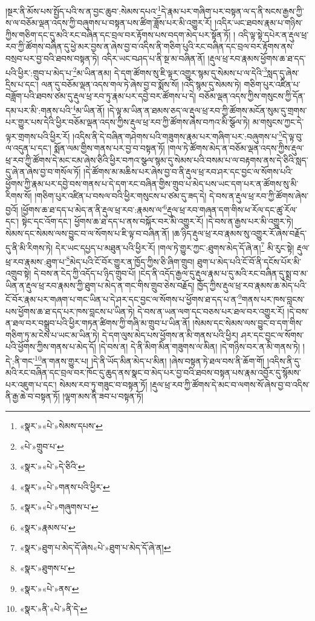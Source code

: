 །སྔར་ནི་མོས་པས་སྤྱོད་པའི་ས་ན་བྱང་ཆུབ་:སེམས་དཔའ་\footnote{«སྣར་»«པེ་»སེམས་དཔས་}དེ་རྣམ་པར་གཞིག་པར་བསྟན་ལ་ད་ནི་སངས་རྒྱས་ཀྱི་ས་ལ་བཅོམ་ལྡན་འདས་ཀྱི་བཞུགས་པ་བསྟན་པས་ཚིག་ཟློས་པར་མི་འགྱུར་རོ། །འདིར་ཡང་ཐབས་རྣམ་པ་གཉིས་ཀྱིས་གཅིག་དང་དུ་མའི་རང་བཞིན་དང་བྲལ་བར་རྟོགས་པས་བདག་མེད་པར་སྟོན་ཏོ། །
འདི་ལྟ་སྟེ་དཔེར་ན་རྡུལ་ཕྲ་རབ་ཀྱི་ཚོགས་བཞིན་དུ་ཕྱེ་མར་བྱས་ན་ཞེས་བྱ་བ་འདིས་ནི་གཅིག་པུའི་རང་བཞིན་དང་བྲལ་བར་རྟོགས་ནས་བསྲབ་པར་བྱ་བའི་ཐབས་བསྟན་ཏེ། འདིར་ཡང་བཤད་པ་ནི་སྔ་མ་བཞིན་ནོ། །རྡུལ་ཕྲ་རབ་རྣམས་ཕྱོགས་ཆ་ཐ་དད་པའི་ཕྱིར་:གྲུབ་པ་མེད་པ་\footnote{«པེ་»གྲུབ་པ་}མ་ཡིན་ནམ། དེ་དག་ཚོགས་སུ་ཇི་ལྟར་འགྱུར་སྙམ་དུ་སེམས་པ་ལ་དེའི་\footnote{«སྣར་»«པེ་»དེ་ཅིའི་}སླད་དུ་ཞེས་དྲིས་པ་དང་། ལན་དུ་བཅོམ་ལྡན་འདས་གལ་ཏེ་ཞེས་བྱ་བ་སྨོས་སོ། །འདི་སྙམ་དུ་སེམས་ཏེ། གཅིག་པུར་འཛིན་པ་བཟློག་པའི་ཐབས་ཙམ་དུ་རྡུལ་ཕྲ་རབ་ཏུ་རྣམ་པར་དབྱེ་བར་ཚོགས་པ་དེ། བཅོམ་ལྡན་འདས་ཀྱིས་གསུངས་ཀྱི་དོན་དམ་པར་མི་:གནས་པའི་\footnote{«སྣར་»«པེ་»གནས་པའི་ཕྱིར་}མ་ཡིན་ནོ། །དེ་ལྟ་མ་ཡིན་ན་ཐམས་ཅད་ལ་རྡུལ་ཕྲ་རབ་ཀྱི་ཚོགས་མངོན་སུམ་དུ་གྲགས་པར་གྱུར་པས་དེའི་ཕྱིར་བཅོམ་ལྡན་འདས་ཀྱིས་རྡུལ་ཕྲ་རབ་ཀྱི་ཚོགས་ཞེས་བཀའ་མི་སྩོལ་ཏེ། མ་གསུངས་ཀྱང་དེ་ལྟར་གྲགས་པའི་ཕྱིར་རོ། །འདིས་ནི་དེ་བཞིན་གཤེགས་པའི་གཟུགས་རྣམ་པར་གཞིག་པར་:བཞུགས་པ་\footnote{«སྣར་»«པེ་»གཞུགས་པ་}དེ་ལྟ་བུ་ལ་འདུན་པ་དང་། སྨོན་ལམ་གྱིས་གནས་པར་བྱ་བ་བསྟན་ཏོ། །གལ་ཏེ་ཚོགས་མེད་ན་བཅོམ་ལྡན་འདས་ཀྱིས་རྡུལ་ཕྲ་རབ་ཀྱི་ཚོགས་དེ་མང་ངམ་ཞེས་ཅིའི་ཕྱིར་བཀའ་སྩལ་སྙམ་དུ་སེམས་པའི་བསམ་པ་ལ་བརྟགས་ནས་དེ་ཅིའི་སླད་དུ་ཞེ་ན་ཞེས་བྱ་བ་གསོལ་ཏོ། །དེ་ཚོགས་མ་མཆིས་པར་ཞེས་བྱ་བ་ནི་རྡུལ་ཕྲ་རབ་ཤར་དང་བྱང་ལ་སོགས་པའི་ཕྱོགས་ཀྱི་རྣམ་པར་དབྱེ་བས་གནས་པ་དེ་དག་རང་བཞིན་གྱིས་གྲུབ་པ་མེད་པས་ཡང་དག་པར་ན་ཚོགས་སུ་མི་རིགས་སོ། །གཅིག་པུར་འཛིན་པ་བསལ་བའི་ཕྱིར་གསུངས་པ་ཙམ་དུ་ཟད་དེ། དེ་བས་ན་རྡུལ་ཕྲ་རབ་ཀྱི་ཚོགས་ཞེས་བྱའོ། །ཕྱོགས་ཆ་ཐ་དད་པ་མེད་ན་ནི་རྡུལ་ཕྲ་རབ་:རྣམས་ལ་\footnote{«སྣར་»རྣམས་པ་}རྡུལ་ཕྲ་རབ་གཞན་དག་གིས་ཕ་རོལ་དང་ཚུ་རོལ་དང་། སྟེང་དང་འོག་དང་། ཕྱོགས་ཆ་ཐ་དད་པ་ནས་བསྐོར་བར་མི་འགྱུར་རོ། །དེ་བས་ན་རྒྱས་པར་མི་འགྱུར་ཏེ། སེམས་དང་སེམས་ལས་བྱུང་བ་ལ་སོགས་པ་ཇི་ལྟ་བ་བཞིན་ནོ། །ཆ་ཉིད་རྡུལ་ཕྲ་རབ་རྣམས་སུ་འགྱུར་རོ་ཞེས་བརྗོད་དུ་ནི་མི་རིགས་ཏེ། དེར་ཡང་དཔྱད་པ་མཐུན་པའི་ཕྱིར་རོ། །གལ་ཏེ་གྱུར་ཀྱང་:ཐུགས་མེད་དོ་ཞེ་ན།\footnote{«སྣར་»ཐུག་པ་མེད་དོ་ཞེས«པེ་»ཐུག་པ་མེད་དོ་ཞེ་ན།} མི་རུང་སྟེ། རྡུལ་ཕྲ་རབ་རྣམས་:ཐུག་པ་\footnote{«སྣར་»ཐུགས་པ་}མེད་པའི་ངོ་བོར་གྱུར་ན་ཁྱོད་ཀྱིས་ཅི་ཞིག་གྲུབ། ཐུག་པ་མེད་པའི་ངོ་བོ་ནི་དངོས་པོར་མི་འགྲུབ་སྟེ། དེ་བས་ན་ངེད་ཀྱི་འདོད་པ་ཉིད་གྲུབ་པོ། །ངེད་ནི་འདོད་རྒྱལ་དུ་རྡུལ་རྣམ་པ་དུ་མའི་རང་བཞིན་དུ་སྨྲ་བ་མ་ཡིན་ན་རྡུལ་ཕྲ་རབ་རྣམས་ཀྱི་ཐུག་པ་མེད་ན་གང་གིས་གྲུབ་ཅེས་བརྗོད། ཁྱོད་ཀྱིས་རྡུལ་ཕྲ་རབ་རྣམས་ཆ་མེད་པའི་ངོ་བོར་རྣམ་པར་གཞག་པ་གང་ཡིན་པ་དེ་ཤར་དང་བྱང་ལ་སོགས་པ་ཕྱོགས་ཐ་དད་པ་ན་\footnote{«སྣར་»«པེ་»ནས་}གནས་པར་ཁས་བླངས་པས་ཕྱོགས་ཆ་ཐ་དད་པར་ཁས་བླངས་པ་ཡིན་ཏེ། དེ་བས་ན་ཡན་ལག་དང་བཅས་པར་ཐལ་བར་འགྱུར་རོ། །དེ་བས་ན་ཐལ་བར་བསྒྲུབ་པའི་ཕྱིར་གཏན་ཚིགས་ཀྱི་གཞི་མ་གྲུབ་པ་ཡིན་ནོ། །སེམས་དང་སེམས་ལས་བྱུང་བ་དག་གིས་གཅིག་ཏུ་མ་ངེས་པ་ཡང་མ་ཡིན་ཏེ། དེ་དག་ལུས་མེད་པས་ཕྱོགས་ན་མི་གནས་པའི་ཕྱིར། ཤར་དང་བྱང་ལ་སོགས་པའི་ཕྱོགས་ཀྱིས་གནས་པ་མེད་དོ། །དེ་བས་ན། དེ་ནི་མིག་མིན་གཟུགས་ལ་མིན། །དེ་གཉིས་བར་ན་མི་གནས་ཏེ། །དེ་:ནི་གང་\footnote{«སྣར་»ནི་«པེ་»ནི་དེ་}ན་གནས་གྱུར་པ། །དེ་ནི་ཡོད་མིན་མེད་པ་མིན། །ཞེས་བསྟན་ཏེ་ཐལ་བས་ནི་ཆོག་གོ། །འདིས་ནི་དུ་མའི་རང་བཞིན་དང་བྲལ་བར་ཁོང་དུ་ཆུད་ནས་སྣང་བ་མེད་པར་བྱ་བའི་ཐབས་བསྟན་པས་རྣམ་འབྱོར་དུ་སྙོམས་པར་འཇུག་པ་དང་། སེམས་རབ་ཏུ་གཟུང་བ་བསྟན་ཏོ། །རྡུལ་ཕྲ་རབ་ཀྱི་ཚོགས་དེ་མང་བ་ལགས་སོ་ཞེས་བྱ་བ་འདིས་ནི་རྒྱ་ཆེ་བ་བསྟན་ཏོ། །ལྷག་མས་ནི་ཟབ་པ་བསྟན་ཏོ། 